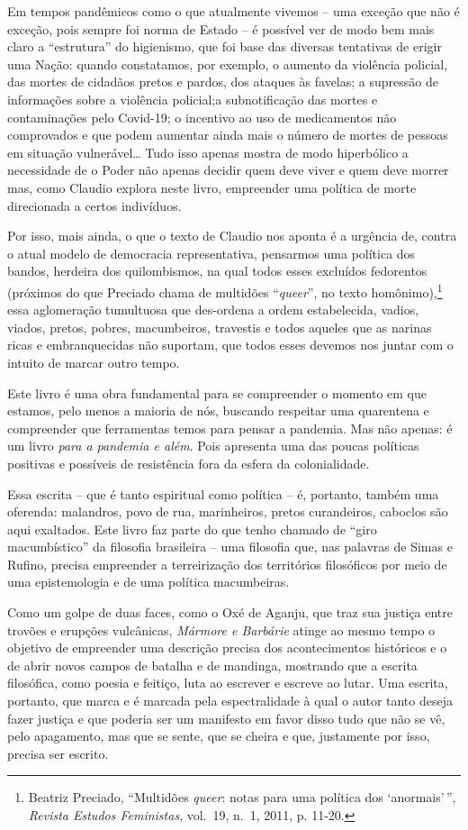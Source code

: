 Em tempos pandêmicos como o que atualmente vivemos -- uma exceção que
não é exceção, pois sempre foi norma de Estado -- é possível ver de modo
bem mais claro a ``estrutura'' do higienismo, que foi base das diversas
tentativas de erigir uma Nação: quando constatamos, por exemplo, o
aumento da violência policial, das mortes de cidadãos pretos e pardos,
dos ataques às favelas; a supressão de informações sobre a violência
policial;a subnotificação das mortes e contaminações pelo Covid-19; o
incentivo ao uso de medicamentos não comprovados e que podem aumentar
ainda mais o número de mortes de pessoas em situação vulnerável\ldots{}
Tudo isso apenas mostra de modo hiperbólico a necessidade de o Poder não
apenas decidir quem deve viver e quem deve morrer mas, como Claudio
explora neste livro, empreender uma política de morte direcionada a
certos indivíduos.

Por isso, mais ainda, o que o texto de Claudio nos aponta é a urgência
de, contra o atual modelo de democracia representativa, pensarmos uma
política dos bandos, herdeira dos quilombismos, na qual todos esses
excluídos fedorentos (próximos do que Preciado chama de multidões
``\emph{queer}'', no texto homônimo),\footnote{Beatriz Preciado,
  ``Multidões \emph{queer}: notas para uma política dos `anormais'\,'',
  \emph{Revista Estudos Feministas}, vol.~19, n.~1, 2011, p. 11-20.}
essa aglomeração tumultuosa que des-ordena a ordem estabelecida, vadios,
viados, pretos, pobres, macumbeiros, travestis e todos aqueles que as
narinas ricas e embranquecidas não suportam, que todos esses devemos nos
juntar com o intuito de marcar outro tempo.

Este livro é uma obra fundamental para se compreender o momento em que
estamos, pelo menos a maioria de nós, buscando respeitar uma quarentena
e compreender que ferramentas temos para pensar a pandemia. Mas não
apenas: é um livro \emph{para a pandemia e além}. Pois apresenta uma das
poucas políticas positivas e possíveis de resistência fora da esfera da
colonialidade.

Essa escrita -- que é tanto espiritual como política -- é, portanto,
também uma oferenda: malandros, povo de rua, marinheiros, pretos
curandeiros, caboclos são aqui exaltados. Este livro faz parte do que
tenho chamado de ``giro macumbístico'' da filosofia brasileira -- uma
filosofia que, nas palavras de Simas e Rufino, precisa empreender a
terreirização dos territórios filosóficos por meio de uma epistemologia
e de uma política macumbeiras.

Como um golpe de duas faces, como o Oxé de Aganju, que traz sua justiça
entre trovões e erupções vulcânicas, \emph{Mármore e Barbárie} atinge ao
mesmo tempo o objetivo de empreender uma descrição precisa dos
acontecimentos históricos e o de abrir novos campos de batalha e de
mandinga, mostrando que a escrita filosófica, como poesia e feitiço,
luta ao escrever e escreve ao lutar. Uma escrita, portanto, que marca e
é marcada pela espectralidade à qual o autor tanto deseja fazer justiça
e que poderia ser um manifesto em favor disso tudo que não se vê, pelo
apagamento, mas que se sente, que se cheira e que, justamente por isso,
precisa ser escrito.

